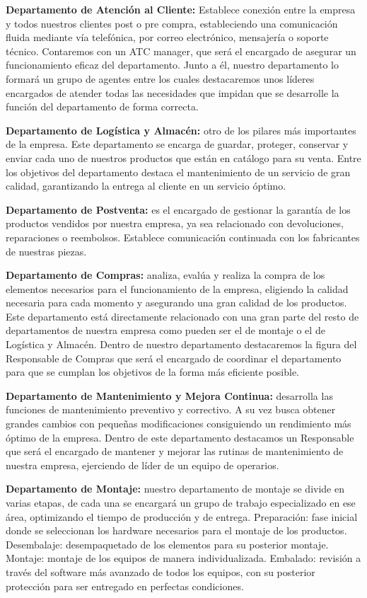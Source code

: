 \textbf{Departamento de Atención al Cliente:} Establece conexión entre la empresa y todos nuestros clientes post o pre compra, estableciendo una comunicación fluida mediante vía telefónica, por correo electrónico, mensajería o soporte técnico. Contaremos con un ATC manager, que será el encargado de asegurar un funcionamiento eficaz del departamento. Junto a él, nuestro departamento lo formará un grupo de agentes entre los cuales destacaremos unos líderes encargados de atender todas las necesidades que impidan que se desarrolle la función del departamento de forma correcta.

\textbf{Departamento de Logística y Almacén:} otro de los pilares más importantes de la empresa. Este departamento se encarga de guardar, proteger, conservar y enviar cada uno de nuestros productos que están en catálogo para su venta. Entre los objetivos del departamento destaca el mantenimiento de un servicio de gran calidad, garantizando la entrega al cliente en un servicio óptimo.

\textbf{Departamento de Postventa:} es el encargado de gestionar la garantía de los productos vendidos por nuestra empresa, ya sea relacionado con devoluciones, reparaciones o reembolsos. Establece comunicación continuada con los fabricantes de nuestras piezas.

\textbf{Departamento de Compras:} analiza, evalúa y realiza la compra de los elementos necesarios para el funcionamiento de la empresa, eligiendo la calidad necesaria para cada momento y asegurando una gran calidad de los productos. Este departamento está directamente relacionado con una gran parte del resto de departamentos de nuestra empresa como pueden ser el de montaje o el de Logística y Almacén. Dentro de nuestro departamento destacaremos la figura del Responsable de Compras que será el encargado de coordinar el departamento para que se cumplan los objetivos de la forma más eficiente posible. 

\textbf{Departamento de Mantenimiento y Mejora Continua:} desarrolla las funciones de mantenimiento preventivo y correctivo. A su vez busca obtener grandes cambios con pequeñas modificaciones consiguiendo un rendimiento más óptimo de la empresa. Dentro de este departamento destacamos un Responsable que será  el encargado de mantener y mejorar las rutinas de mantenimiento de nuestra empresa, ejerciendo de líder de un equipo de operarios.

\textbf{Departamento de Montaje:} nuestro departamento de montaje se divide en varias etapas, de cada una se encargará un grupo de trabajo especializado en ese área, optimizando el tiempo de producción y de entrega. Preparación:  fase inicial donde se seleccionan los hardware necesarios para el montaje de los productos. Desembalaje: desempaquetado de los elementos para su posterior montaje. Montaje: montaje de los equipos de manera individualizada. Embalado: revisión a través del software más avanzado de todos los equipos, con su posterior protección para ser entregado en perfectas condiciones.
